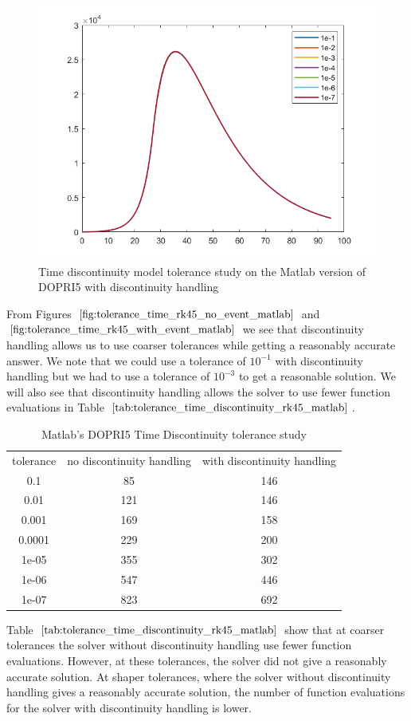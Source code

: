 \begin{figure}[H]
\centering
\includegraphics[width=0.7\linewidth]{./figures/tolerance_time_rk45_with_event_matlab}
\caption{Time discontinuity model tolerance study on the Matlab version of DOPRI5 with discontinuity handling}
\label{fig:tolerance_time_rk45_with_event_matlab}
\end{figure}

From Figures $\ref{fig:tolerance_time_rk45_no_event_matlab}$ and $\ref{fig:tolerance_time_rk45_with_event_matlab}$ we see that discontinuity handling allows us to use coarser tolerances while getting a reasonably accurate answer. We note that we could use a tolerance of $10^{-1}$ with discontinuity handling but we had to use a tolerance of $10^{-3}$ to get a reasonable solution. We will also see that discontinuity handling allows the solver to use fewer function evaluations in Table $\ref{tab:tolerance_time_discontinuity_rk45_matlab}$.

\begin{table}[H]
\caption {Matlab's DOPRI5 Time Discontinuity tolerance study} 
\label{tab:tolerance_time_discontinuity_rk45_matlab} 
\begin{center}
\begin{tabular}{ c c c }
tolerance & no discontinuity handling & with discontinuity handling\\ 
0.1 & 85 & 146 \\
0.01 & 121 & 146 \\
0.001 & 169 & 158 \\
0.0001 & 229 & 200 \\
1e-05 & 355 & 302 \\
1e-06 & 547 & 446 \\
1e-07 & 823 & 692 \\
\end{tabular}
\end{center}
\end{table}

Table $\ref{tab:tolerance_time_discontinuity_rk45_matlab}$ show that at coarser tolerances the solver without discontinuity handling use fewer function evaluations. However, at these tolerances, the solver did not give a reasonably accurate solution. At shaper tolerances, where the solver without discontinuity handling gives a reasonably accurate solution, the number of function evaluations for the solver with discontinuity handling is lower.
